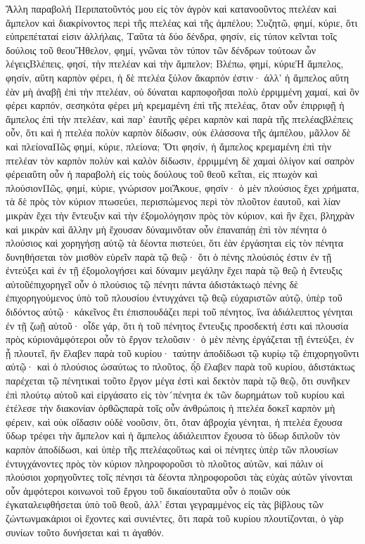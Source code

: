 Ἄλλη παραβολή
Περιπατοῦντός μου εἰς τὸν ἀγρὸν καὶ κατανοοῦντος πτελέαν καὶ ἄμπελον καὶ διακρίνοντος περὶ τῆς πτελέας καὶ τῆς ἀμπέλου; Συζητῶ, φημί, κύριε, ὅτι εὐπρεπέταταί εἰσιν ἀλλήλαις, Ταῦτα τὰ δύο δένδρα, φησίν, εἰς τύπον κεῖνται τοῖς δούλοις τοῦ θεουἬθελον, φημί, γνῶναι τὸν τύπον τῶν δένδρων τούτοων ὧν λέγειςΒλέπεις, φησί, τὴν πτελέαν καὶ τὴν ἄμπελον; Βλέπω, φημί, κύριεἩ ἄμπελος, φησίν, αὕτη καρπὸν φέρει, ἡ δὲ πτελέα ξύλον ἄκαρπόν ἐστιν· ἀλλ’ ἡ ἄμπελος αὕτη ἐὰν μὴ ἀναβῇ ἐπὶ τὴν πτελέαν, οὐ δύναται καρποφοῆσαι πολὺ ἐρριμμένη χαμαί, καὶ ὃν φέρει καρπόν, σεσηκότα φέρει μὴ κρεμαμένη ἐπὶ τῆς πτελέας, ὅταν οὖν ἐπιρριφῇ ἡ ἄμπελος ἐπὶ τὴν πτελέαν, καὶ παρ’ ἑαυτῆς φέρει καρπὸν καὶ παρὰ τῆς πτελέαςβλέπεις οὖν, ὅτι καὶ ἡ πτελέα πολὺν καρπὸν δίδωσιν, οὐκ ἐλάσσονα τῆς ἀμπέλου, μᾶλλον δὲ καὶ πλείοναΠῶς φημί, κύριε, πλείονα; Ὅτι φησίν, ἡ ἄμπελος κρεμαμένη ἐπὶ τὴν πτελέαν τὸν καρπὸν πολὺν καὶ καλὸν δίδωσιν, ἐρριμμένη δὲ χαμαὶ ὀλίγον καί σαπρὸν φέρειαὕτη οὖν ἡ παραβολὴ εἰς τοὺς δούλους τοῦ θεοῦ κεῖται, εἰς πτωχὸν καὶ πλούσιονΠῶς, φημί, κύριε, γνώρισον μοιἌκουε, φησίν· ὁ μὲν πλούσιος ἔχει χρήματα, τὰ δὲ πρὸς τὸν κύριον πτωσεύει, περισπώμενος περὶ τὸν πλοῦτον ἑαυτοῦ, καὶ λίαν μικρὰν ἔχει τὴν ἔντευξιν καὶ τὴν ἐξομολόγησιν πρὸς τὸν κύριον, καὶ ἣν ἔχει, βληχρὰν καὶ μικρὰν καὶ ἄλλην μὴ ἔχουσαν δύναμινὅταν οὖν ἐπαναπάῃ ἐπὶ τὸν πένητα ὁ πλούσιος καὶ χορηγήσῃ αὐτῷ τὰ δέοντα πιστεύει, ὅτι ἐὰν ἐργάσηται εἰς τὸν πένητα δυνηθήσεται τὸν μισθὸν εὑρεῖν παρὰ τῷ θεῷ· ὅτι ὁ πένης πλούσιός ἐστιν ἐν τῇ ἐντεύξει καὶ ἐν τῇ ἐξομολογήσει καὶ δύναμιν μεγάλην ἔχει παρὰ τῷ θεῷ ἡ ἔντευξις αὐτοῦἐπιχορηγεῖ οὖν ὁ πλούσιος τῷ πένητι πάντα ἀδιστάκτωςὁ πένης δὲ ἐπιχορηγούμενος ὑπὸ τοῦ πλουσίου ἐντυγχάνει τῷ θεῷ εὐχαριστῶν αὐτῷ, ὑπὲρ τοῦ διδόντος αὐτῷ· κἀκεῖνος ἔτι ἐπισπουδάζει περὶ τοῦ πένητος, ἵνα ἀδιάλειπτος γένηται ἐν τῇ ζωῇ αὐτοῦ· οἶδε γάρ, ὅτι ἡ τοῦ πένητος ἔντευξις προσδεκτή ἐστι καὶ πλουσία πρὸς κύριονἀμφότεροι οὖν τὸ ἔργον τελοῦσιν· ὁ μὲν πένης ἐργάζεται τῇ ἐντεύξει, ἐν ᾗ πλουτεῖ, ἣν ἔλαβεν παρὰ τοῦ κυρίου· ταύτην ἀποδίδωσι τῷ κυρίῳ τῷ ἐπιχορηγοῦντι αὐτῷ· καὶ ὁ πλούσιος ὡσαύτως το πλοῦτος, ὃ́ͅὃ ἔλαβεν παρὰ τοῦ κυρίου, ἀδιστάκτως παρέχεται τῷ πένητικαὶ τοῦτο ἔργον μέγα ἐστὶ καὶ δεκτὸν παρὰ τῷ θεῷ, ὅτι συνῆκεν ἐπὶ πλούτῳ αὐτοῦ καὶ εἰργάσατο εἰς τὸν´πένητα ἐκ τῶν δωρημάτων τοῦ κυρίου καὶ ἐτέλεσε τὴν διακονίαν ὀρθῶςπαρὰ τοῖς οὖν ἀνθρώποις ἡ πτελέα δοκεῖ καρπὸν μὴ φέρειν, καὶ οὐκ οἴδασιν οὐδὲ νοοῦσιν, ὅτι, ὅταν ἀβροχία γένηται, ἡ πτελέα ἔχουσα ὕδωρ τρέφει τὴν ἄμπελον καὶ ἡ ἄμπελος ἀδιάλειπτον ἔχουσα τὸ ὕδωρ διπλοῦν τὸν καρπὸν ἀποδίδωσι, καὶ ὑπὲρ τῆς πτελέαςοὕτως καὶ οἱ πένητες ὑπὲρ τῶν πλουσίων ἐντυγχάνοντες πρὸς τὸν κύριον πληροφοροῦσι τὸ πλοῦτος αὐτῶν, καὶ πάλιν οἱ πλούσιοι χορηγοῦντες τοῖς πένησι τὰ δέοντα πληροφοροῦσι τὰς εὐχὰς αὐτῶν γίνονται οὖν ἀμφότεροι κοινωνοὶ τοῦ ἔργου τοῦ δικαίουταῦτα οὖν ὁ ποιῶν οὐκ ἐγκαταλειφθήσεται ὑπὸ τοῦ θεοῦ, ἀλλ’ ἔσται γεγραμμένος εἰς τὰς βίβλους τῶν ζώντωνμακάριοι οἱ ἔχοντες καὶ συνιέντες, ὅτι παρὰ τοῦ κυρίου πλουτίζονται, ὁ γὰρ συνίων τοῦτο δυνήσεται καὶ τι ἀγαθόν.
